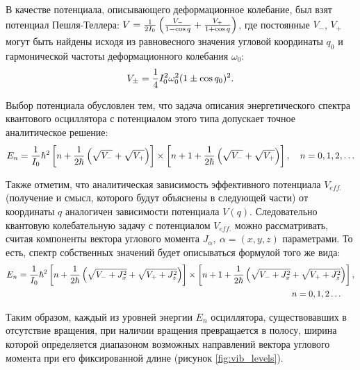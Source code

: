 В качестве потенциала, описывающего деформационное колебание, был взят потенциал Пешля-Теллера: $V = \frac{1}{2I_0} \left( \frac{V_{-}}{1 - \cos q} + \frac{V_{+}}{1 + \cos q} \right)$, где постоянные $V_{-}$, $V_{+}$ могут быть найдены исходя из равновесного значения угловой координаты $q_0$ и гармонической частоты деформационного колебания $\omega_0$:
\vverh
\begin{gather}
V_{\pm} = \frac{1}{4} I_0^2 \omega_0^2 (1 \pm \cos q_0 )^2. \notag
\end{gather}

Выбор потенциала обусловлен тем, что задача описания энергетического спектра квантового осциллятора с потенциалом этого типа допускает точное аналитическое решение:
\vverh
\begin{gather}
E_n = \frac{1}{I_0} \hbar^2 \left[ n + \frac{1}{2 \hbar} \left( \sqrt{V_{-}} + \sqrt{V_{+}} \right) \right] \times \left[ n + 1 + \frac{1}{2 \hbar} \left( \sqrt{V_{-}} + \sqrt{V_{+}} \right) \right], \quad n = 0, 1, 2, \dots \notag 
\end{gather}

Также отметим, что аналитическая зависимость эффективного потенциала $V_{eff.}$ (получение и смысл, которого будут объяснены в следующей части) от координаты $q$ аналогичен зависимости потенциала $V(q)$. Следовательно квантовую колебательную задачу с потенциалом $V_{eff.}$ можно рассматривать, считая компоненты вектора углового момента $J_\alpha, \ \alpha = (x, y, z)$ параметрами. То есть, спектр собственных значений будет описываться формулой того же вида:
\vverh
\begin{gather}
E_n = \frac{1}{I_0} \hbar^2 \left[ n + \frac{1}{2 \hbar} \left( \sqrt{V_{-} + J_x^2} + \sqrt{V_{+} + J_z^2} \right) \right] \times \left[ n + 1 + \frac{1}{2 \hbar} \left( \sqrt{V_{-} + J_x^2} + \sqrt{V_{+} + J_z^2} \right) \right], \notag \\ 
 \hspace{11cm} n = 0, 1, 2 \dots \notag
\end{gather}

Таким образом, каждый из уровней энергии $E_n$ осциллятора, существовавших в отсутствие вращения, при наличии вращения превращается в полосу, ширина которой определяется диапазоном возможных направлений вектора углового момента при его фиксированной длине (рисунок \eqref{fig:vib_levels}).

